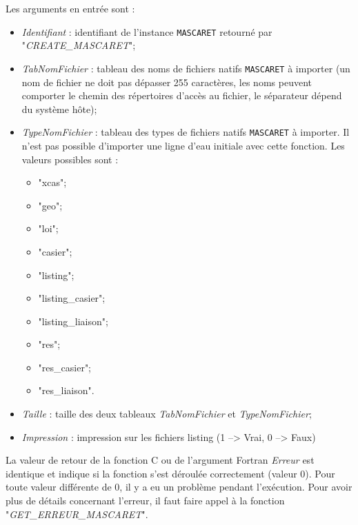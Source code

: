\documentclass[a4paper,11pt]{article}
\begin{document}
 Les arguments en entr\'ee sont :
 \vspace{0.5cm}
 \begin{itemize}
    \item \textit{Identifiant} : identifiant de l'instance \texttt{MASCARET} retourn\'e par "\textit{CREATE\_MASCARET}";
    \vspace{0.5cm}
    \item \textit{TabNomFichier} : tableau des noms de fichiers natifs \texttt{MASCARET} \`a importer (un nom de fichier ne doit pas d\'epasser 255 caract\`eres, les noms peuvent comporter le chemin des r\'epertoires d'acc\`es au fichier, le s\'eparateur d\'epend du syst\`eme h\^ote);
    \vspace{0.5cm}
    \item \textit{TypeNomFichier} : tableau des types de fichiers natifs \texttt{MASCARET} \`a importer. Il n'est pas possible d'importer une ligne d'eau initiale avec cette fonction. Les valeurs possibles sont :
      \vspace{0.5cm}
      \begin{itemize}
        \item "xcas";
        \item "geo";
        \item "loi";
        \item "casier";
        \item "listing";
        \item "listing\_casier";
        \item "listing\_liaison";
        \item "res";
        \item "res\_casier";
        \item "res\_liaison".
      \end{itemize}
    \vspace{0.5cm}
    \item \textit{Taille} : taille des deux tableaux \textit{TabNomFichier} et \textit{TypeNomFichier};
    \vspace{0.5cm}
    \item \textit{Impression} : impression sur les fichiers listing (1 --> Vrai, 0 --> Faux)
 \end{itemize} 
 
 \vspace{0.5cm}
 
  La valeur de retour de la fonction C ou de l'argument Fortran \textit{Erreur} est identique et indique si la fonction s'est d\'eroul\'ee correctement (valeur 0). Pour toute valeur diff\'erente de 0, il y a eu un probl\`eme pendant l'ex\'ecution. Pour avoir plus de d\'etails concernant l'erreur, il faut faire appel \`a la fonction "\textit{GET\_ERREUR\_MASCARET}".
\end{document}
